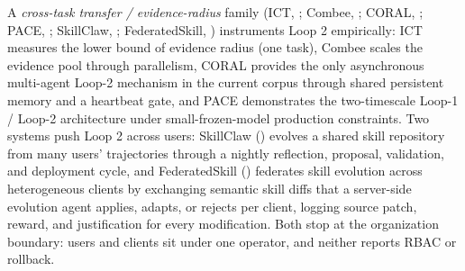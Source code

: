 \documentclass[
]{article}
\begin{document}
A \emph{cross-task transfer / evidence-radius} family (ICT,
; Combee,
; CORAL,
; PACE,
; SkillClaw,
; FederatedSkill,
) instruments
Loop 2 empirically: ICT measures the lower bound of evidence radius (one
task), Combee scales the evidence pool through parallelism, CORAL
provides the only asynchronous multi-agent Loop-2 mechanism in the
current corpus through shared persistent memory and a heartbeat gate,
and PACE demonstrates the two-timescale Loop-1 / Loop-2 architecture
under small-frozen-model production constraints. Two systems push Loop 2
across users: SkillClaw ()
evolves a shared skill repository from many users' trajectories through
a nightly reflection, proposal, validation, and deployment cycle, and
FederatedSkill () federates skill evolution across heterogeneous clients by
exchanging semantic skill diffs that a server-side evolution agent
applies, adapts, or rejects per client, logging source patch, reward,
and justification for every modification. Both stop at the organization
boundary: users and clients sit under one operator, and neither reports
RBAC or rollback.
\end{document}
